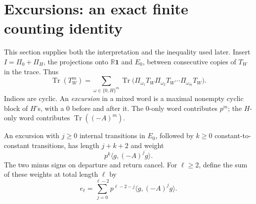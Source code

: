 \documentclass[11pt]{article}
\numberwithin{equation}{section}
\theoremstyle{remark}
\newcommand{\Tr}{\operatorname{Tr}}
\newcommand{\one}{\mathbf 1}
\newcommand{\R}{\mathbb R}
\newcommand{\ip}[2]{\langle #1,#2\rangle}
\begin{document}
\section{Excursions: an exact finite counting identity}\label{sec:excursions}
This section supplies both the interpretation and the inequality used later. Insert
$I=\Pi_0+\Pi_H$, the projections onto $\R\one$ and $E_0$, between consecutive copies of $T_W$ in the trace. Thus
\begin{equation}\label{eq:words}
 \Tr(T_W^m)=\sum_{\omega\in\{0,H\}^m}
 \Tr\bigl(\Pi_{\omega_1}T_W\Pi_{\omega_2}T_W\cdots\Pi_{\omega_m}T_W\bigr).
\end{equation}
Indices are cyclic. An \emph{excursion} in a mixed word is a maximal nonempty cyclic block of $H$'s, with a $0$ before and after it. The $0$-only word contributes $p^m$; the $H$-only word contributes $\Tr((-A)^m)$.

An excursion with $j\ge0$ internal transitions in $E_0$, followed by $k\ge0$ constant-to-constant transitions, has length $j+k+2$ and weight
\[
 p^k\ip{g}{(-A)^j g}.
\]
The two minus signs on departure and return cancel. For $\ell\ge2$, define the sum of these weights at total length $\ell$ by
\begin{equation}\label{eq:e}
 e_\ell=\sum_{j=0}^{\ell-2}p^{\ell-2-j}\ip{g}{(-A)^j g}.
\end{equation}
\end{document}

